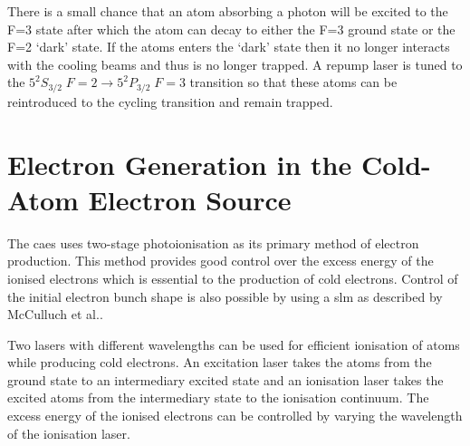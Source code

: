 There is a small chance that an atom absorbing a photon will be excited to the F=3 state after which the atom can decay to either the F=3 ground state or the F=2 `dark' state. If the atoms enters the `dark' state then it no longer interacts with the cooling beams and thus is no longer trapped. A repump laser is tuned to the $5 ^2 S_{3/2}\;F=2\rightarrow5 ^2 P_{3/2}\;F=3$ transition so that these atoms can be reintroduced to the cycling transition and remain trapped.

\section{Electron Generation in the Cold-Atom Electron Source}
The \gls{caes} uses two-stage photoionisation as its primary method of electron production. This method provides good control over the excess energy of the ionised electrons which is essential to the production of cold electrons. Control of the initial electron bunch shape is also possible by using a \gls{slm} as described by McCulluch et al.\cite{mcculloch_arbitrarily_2011}.

Two lasers with different wavelengths can be used for efficient ionisation of atoms while producing cold electrons. An excitation laser takes the atoms from the ground state to an intermediary excited state and an ionisation laser takes the excited atoms from the intermediary state to the ionisation continuum. The excess energy of the ionised electrons can be controlled by varying the wavelength of the ionisation laser.

